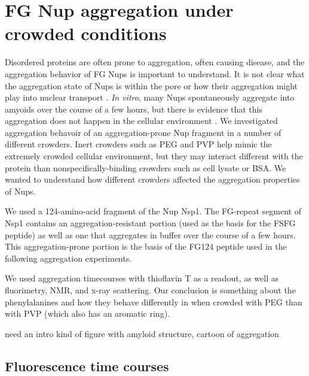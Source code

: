\chapter{FG Nup aggregation under crowded conditions}\label{ch05}

Disordered proteins are often prone to aggregation, often causing disease, and the aggregation behavior of FG Nups is important to understand.  It is not clear what the aggregation state of Nups is within the pore or how their aggregation might play into nuclear transport \cite{things}.  \textit{In vitro}, many Nups spontaneously aggregate into amyoids over the course of a few hours, but there is evidence that this aggregation does not happen in the cellular environment \cite{frey07, Loren's paper}.  We investigated aggregation behavoir of an aggregation-prone Nup fragment in a number of different crowders.  Inert crowders such as PEG and PVP help mimic the extremely crowded cellular environment, but they may interact different with the protein than nonspecifically-binding crowders such as cell lysate or BSA.  We wanted to understand how different crowders affected the aggregation properties of Nups.

We used a 124-amino-acid fragment of the Nup Nsp1.  The FG-repeat segment of Nsp1 contains an aggregation-resistant portion (used as the basis for the FSFG peptide) as well as one that aggregates in buffer over the course of a few hours.  This aggregation-prone portion is the basis of the FG124 peptide used in the following aggregation experiments.

We used aggregation timecourses with thioflavin T as a readout, as well as fluorimetry, NMR, and x-ray scattering.  Our conclusion is something about the phenylalanines and how they behave differently in when crowded with PEG than with PVP (which also has an aromatic ring).

need an intro kind of figure with amyloid structure, cartoon of aggregation

\section{Fluorescence time courses}

